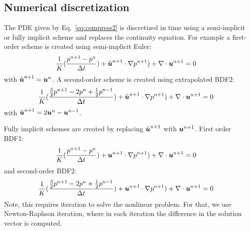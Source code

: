 \subsection{Numerical discretization}
The PDE given by Eq.~\eqref{eq:compress2} is discretized in time using a semi-implicit or fully implicit scheme and replaces the continuity equation. 
For example a first-order scheme is created using semi-implicit Euler:
\[
   \frac1K(\frac{p^{n+1}-p^n}{\Delta t})+\hat{\boldsymbol{u}}^{n+1}\cdot\nabla p^{n+1})+
     \nabla\cdot\boldsymbol{u}^{n+1} = 0
\]
with $\hat{\boldsymbol{u}}^{n+1}=\boldsymbol{u}^n$. A second-order scheme is created using extrapolated BDF2:
\[
   \frac1K(\frac{\frac32p^{n+1}-2p^n+\frac12p^{n-1}}{\Delta t})+\hat{\boldsymbol{u}}^{n+1}\cdot\nabla p^{n+1})+
     \nabla\cdot\boldsymbol{u}^{n+1} = 0
\]
with $\hat{\boldsymbol{u}}^{n+1}=2\boldsymbol{u}^n-\boldsymbol{u}^{n-1}$. 

Fully implicit schemes are created by replacing $\hat{\boldsymbol{u}}^{n+1}$ with $\boldsymbol{u}^{n+1}$. First order BDF1:
\[
   \frac1K(\frac{p^{n+1}-p^n}{\Delta t})+\boldsymbol{u}^{n+1}\cdot\nabla p^{n+1})+
     \nabla\cdot\boldsymbol{u}^{n+1} = 0
\]
and second-order BDF2:
\[
   \frac1K(\frac{\frac32p^{n+1}-2p^n+\frac12p^{n-1}}{\Delta t})+\boldsymbol{u}^{n+1}\cdot\nabla p^{n+1})+
     \nabla\cdot\boldsymbol{u}^{n+1} = 0
\]
Note, this requires iteration to solve the nonlinear problem. For that, we use Newton-Raphson iteration, where in each iteration the difference in the solution vector is computed.


